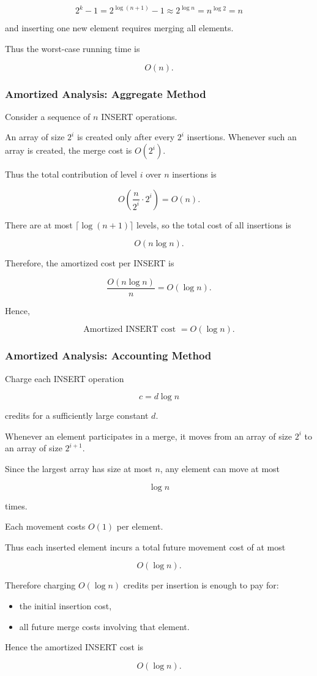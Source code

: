 \documentclass[12pt]{article}
\begin{document}
\[
2^k - 1 = 2^{\log(n+1)} - 1 \approx 2^{\log n} = n^{\log2} = n
\]

and inserting one new element requires merging all elements.

Thus the worst-case running time is

\[
\boxed{O(n)}.
\]

\subsubsection*{Amortized Analysis: Aggregate Method}

Consider a sequence of \(n\) INSERT operations.

An array of size \(2^i\) is created only after every \(2^i\) insertions.
Whenever such an array is created, the merge cost is \(O(2^i)\).

Thus the total contribution of level \(i\) over \(n\) insertions is

\[
O\left(\frac{n}{2^i} \cdot 2^i\right)
=
O(n).
\]

There are at most $\lceil \log(n+1) \rceil$ levels, so the total cost of all insertions is

\[
O(n \log n).
\]

Therefore, the amortized cost per INSERT is

\[
\frac{O(n \log n)}{n}
=
O(\log n).
\]

Hence,

\[
\boxed{\text{Amortized INSERT cost } = O(\log n)}.
\]

\subsubsection*{Amortized Analysis: Accounting Method}

Charge each INSERT operation

\[
c = d \log n
\]

credits for a sufficiently large constant \(d\).

Whenever an element participates in a merge, it moves from an array of size \(2^i\) to an array of size \(2^{i+1}\).

Since the largest array has size at most \(n\), any element can move at most

\[
\log n
\]

times.

Each movement costs \(O(1)\) per element.

Thus each inserted element incurs a total future movement cost of at most

\[
O(\log n).
\]

Therefore charging \(O(\log n)\) credits per insertion is enough to pay for:

\begin{itemize}
    \item the initial insertion cost,
    \item all future merge costs involving that element.
\end{itemize}

Hence the amortized INSERT cost is

\[
\boxed{O(\log n)}.
\]
\end{document}
